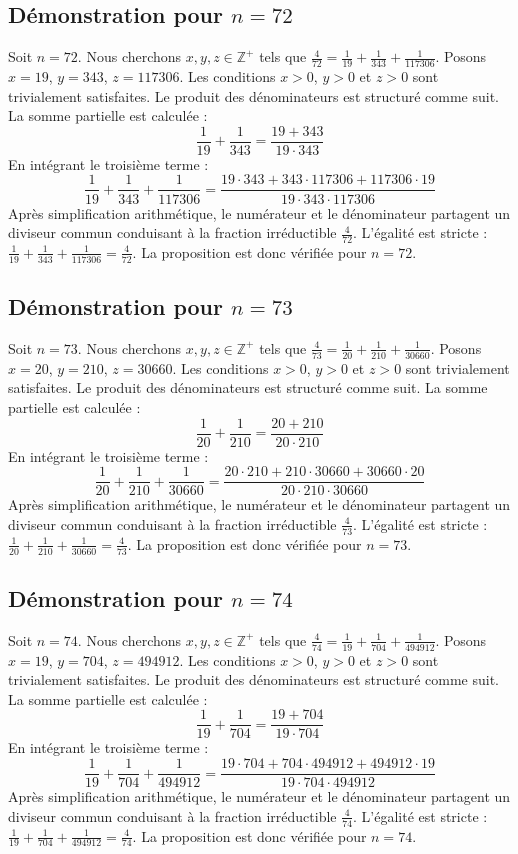 \documentclass[11pt,a4paper]{article}
\begin{document}
\subsection{Démonstration pour $n = 72$}
Soit $n = 72$. Nous cherchons $x, y, z \in \mathbb{Z}^{+}$ tels que $\frac{4}{72} = \frac{1}{19} + \frac{1}{343} + \frac{1}{117306}$.
Posons $x = 19$, $y = 343$, $z = 117306$.
Les conditions $x > 0$, $y > 0$ et $z > 0$ sont trivialement satisfaites.
Le produit des dénominateurs est structuré comme suit. La somme partielle est calculée :
$$ \frac{1}{19} + \frac{1}{343} = \frac{19+343}{19 \cdot 343} $$
En intégrant le troisième terme :
$$ \frac{1}{19} + \frac{1}{343} + \frac{1}{117306} = \frac{19 \cdot 343 + 343 \cdot 117306 + 117306 \cdot 19}{19 \cdot 343 \cdot 117306} $$
Après simplification arithmétique, le numérateur et le dénominateur partagent un diviseur commun conduisant à la fraction irréductible $\frac{4}{72}$.
L'égalité est stricte : $\frac{1}{19} + \frac{1}{343} + \frac{1}{117306} = \frac{4}{72}$.
La proposition est donc vérifiée pour $n = 72$.
\subsection{Démonstration pour $n = 73$}
Soit $n = 73$. Nous cherchons $x, y, z \in \mathbb{Z}^{+}$ tels que $\frac{4}{73} = \frac{1}{20} + \frac{1}{210} + \frac{1}{30660}$.
Posons $x = 20$, $y = 210$, $z = 30660$.
Les conditions $x > 0$, $y > 0$ et $z > 0$ sont trivialement satisfaites.
Le produit des dénominateurs est structuré comme suit. La somme partielle est calculée :
$$ \frac{1}{20} + \frac{1}{210} = \frac{20+210}{20 \cdot 210} $$
En intégrant le troisième terme :
$$ \frac{1}{20} + \frac{1}{210} + \frac{1}{30660} = \frac{20 \cdot 210 + 210 \cdot 30660 + 30660 \cdot 20}{20 \cdot 210 \cdot 30660} $$
Après simplification arithmétique, le numérateur et le dénominateur partagent un diviseur commun conduisant à la fraction irréductible $\frac{4}{73}$.
L'égalité est stricte : $\frac{1}{20} + \frac{1}{210} + \frac{1}{30660} = \frac{4}{73}$.
La proposition est donc vérifiée pour $n = 73$.
\subsection{Démonstration pour $n = 74$}
Soit $n = 74$. Nous cherchons $x, y, z \in \mathbb{Z}^{+}$ tels que $\frac{4}{74} = \frac{1}{19} + \frac{1}{704} + \frac{1}{494912}$.
Posons $x = 19$, $y = 704$, $z = 494912$.
Les conditions $x > 0$, $y > 0$ et $z > 0$ sont trivialement satisfaites.
Le produit des dénominateurs est structuré comme suit. La somme partielle est calculée :
$$ \frac{1}{19} + \frac{1}{704} = \frac{19+704}{19 \cdot 704} $$
En intégrant le troisième terme :
$$ \frac{1}{19} + \frac{1}{704} + \frac{1}{494912} = \frac{19 \cdot 704 + 704 \cdot 494912 + 494912 \cdot 19}{19 \cdot 704 \cdot 494912} $$
Après simplification arithmétique, le numérateur et le dénominateur partagent un diviseur commun conduisant à la fraction irréductible $\frac{4}{74}$.
L'égalité est stricte : $\frac{1}{19} + \frac{1}{704} + \frac{1}{494912} = \frac{4}{74}$.
La proposition est donc vérifiée pour $n = 74$.
\end{document}
